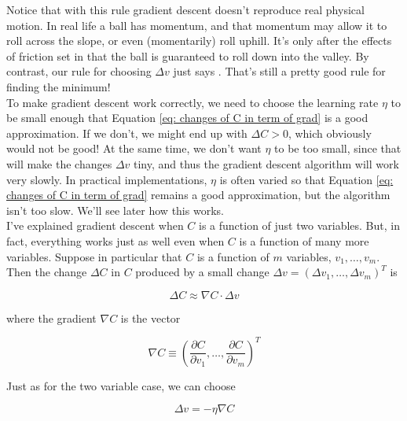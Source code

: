 Notice that with this rule gradient descent doesn't reproduce real physical motion. In real life a ball has momentum, and that momentum may allow it to roll across the slope, or even (momentarily) roll uphill. It's only after the effects of friction set in that the ball is guaranteed to roll down into the valley. By contrast, our rule for choosing $\Delta v$ just says . That's still a pretty good rule for finding the minimum!\\

To make gradient descent work correctly, we need to choose the learning rate $\eta$ to be small enough that Equation \ref{eq: changes of C in term of grad} is a good approximation. If we don't, we might end up with $\Delta C>0$, which obviously would not be good! At the same time, we don't want $\eta$ to be too small, since that will make the changes $\Delta v$ tiny, and thus the gradient descent algorithm will work very slowly. In practical implementations, $\eta$ is often varied so that Equation \ref{eq: changes of C in term of grad} remains a good approximation, but the algorithm isn't too slow. We'll see later how this works.\\

I've explained gradient descent when $C$ is a function of just two variables. But, in fact, everything works just as well even when $C$ is a function of many more variables. Suppose in particular that $C$ is a function of $m$ variables, $v_1,…,v_m$. Then the change $\Delta C$ in $C$ produced by a small change $\Delta v=\left(\Delta v_1,…,\Delta v_m\right)^T$ is

\begin{equation}
\Delta C\approx\nabla C \cdot \Delta v
\label{eq: changes of C in term of grad for m variables}
\end{equation}

where the gradient $\nabla C$ is the vector

\begin{equation}
\nabla C\equiv \left(\frac{\partial C}{\partial v_1}, \ldots, \frac{\partial C}{\partial v_m}\right)^T
\label{eq: grad of C for m variables}
\end{equation}

Just as for the two variable case, we can choose

\begin{equation}
\Delta v=- \eta \nabla C
\label{eq: choice on v for m variables}
\end{equation}

